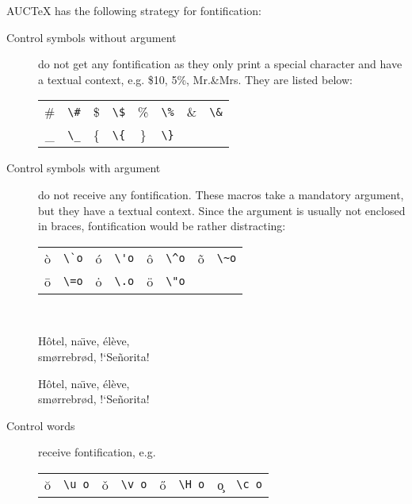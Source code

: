 \documentclass[a4paper]{article}
\begin{document}
AUC\TeX{} has the following strategy for fontification:
\begin{description}
\item[Control symbols without argument] do not get any fontification
  as they only print a special character and have a textual context,
  e.g. \$10, 5\%, Mr.\&Mrs.  They are listed below:
  \begin{center}
    \begin{tabular}{@{}*{4}{cl}@{}}
      \hline
      \#   & \verb|\#| & \$ & \verb|\$|
      & \% & \verb|\%| & \& & \verb|\&| \\
      \_   & \verb|\_| & \{ & \verb|\{|
      & \} & \verb|\}|                  \\
      \hline
    \end{tabular}
\end{center}
\item[Control symbols with argument] do not receive any fontification.
  These macros take a mandatory argument, but they have a textual
  context.  Since the argument is usually not enclosed in braces,
  fontification would be rather distracting:
  \begin{center}
    \begin{tabular}{@{}*{4}{cl}@{}}
      \hline
      \`o   & \verb|\`o| & \'o & \verb|\'o|
      & \^o & \verb|\^o| & \~o & \verb|\~o|  \\
      \=o   & \verb|\=o| & \.o & \verb|\.o|
      & \"o & \verb|\"o|                     \\
      \hline
    \end{tabular} \\[1ex]
    \begin{minipage}{0.4\linewidth}\centering
      H\^{o}tel, na\"\i ve, \'{e}l\`{e}ve,\\
      sm\o rrebr\o d, !`Se\~{n}orita!
    \end{minipage}\quad
    \begin{minipage}{0.4\linewidth}\centering
      H\^otel, na\"\i ve, \'el\`eve,\\
      sm\o rrebr\o d, !`Se\~norita!
    \end{minipage}
  \end{center}
\item[Control words] receive fontification, e.g.
  \begin{center}
    \begin{tabular}{@{}*{4}{cl}@{}}
      \hline
      \u o    & \verb|\u o| & \v o & \verb|\v o|
      & \H o  & \verb|\H o| & \c o & \verb|\c o| \\

\end{tabular}
\end{center}
\end{description}
\end{document}
